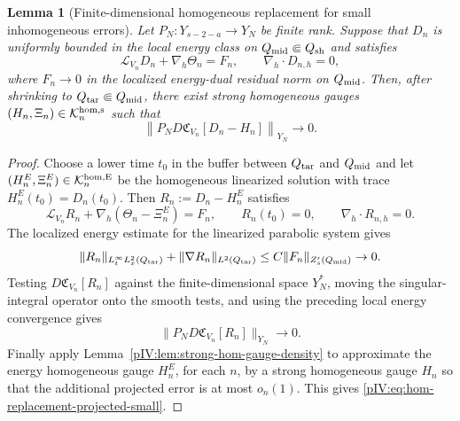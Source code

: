 \documentclass[11pt]{article}
\numberwithin{equation}{section}
\theoremstyle{plain}
\newtheorem{lemma}{Lemma}[section]
\theoremstyle{definition}
\theoremstyle{remark}
\newcommand{\nabh}{\nabla_h}
\newcommand{\divh}{\nabla_h\!\cdot}
\newcommand{\calC}{\mathfrak C}
\newcommand{\calK}{\mathcal K}
\begin{document}
\begin{lemma}[Finite-dimensional homogeneous replacement for small inhomogeneous errors]
\label{pIV:lem:homogeneous-replacement-small-errors}
Let \(P_N:Y_{s-2-a}\to Y_N\) be finite rank.  Suppose that \(D_n\) is uniformly bounded
in the local energy class on \(Q_{\rm mid}\Subset Q_{\rm sh}\) and satisfies
\begin{equation}\label{pIV:eq:small-inhomogeneous-equation}
        \mathcal L_{V_n}D_n+\nabh\Theta_n=F_n,
        \qquad
        \divh D_{n,h}=0,
\end{equation}
where \(F_n\to0\) in the localized energy-dual residual norm on \(Q_{\rm mid}\).  Then,
after shrinking to \(Q_{\rm tar}\Subset Q_{\rm mid}\), there exist strong homogeneous
gauges \((H_n,\Xi_n)\in\calK^{\rm hom,s}_n\) such that
\begin{equation}\label{pIV:eq:hom-replacement-projected-small}
        \left\|
        P_ND\calC_{V_n}[D_n-H_n]
        \right\|_{Y_N}
        \longrightarrow0 .
\end{equation}
\end{lemma}

\begin{proof}
Choose a lower time \(t_0\) in the buffer between \(Q_{\rm tar}\) and \(Q_{\rm mid}\)
and let \((H_n^E,\Xi_n^E)\in\calK^{\rm hom,E}_n\) be the homogeneous linearized
solution with trace \(H_n^E(t_0)=D_n(t_0)\).  Then
\(R_n:=D_n-H_n^E\) satisfies
\[
        \mathcal L_{V_n}R_n+\nabh(\Theta_n-\Xi_n^E)=F_n,
        \qquad
        R_n(t_0)=0,
        \qquad
        \divh R_{n,h}=0.
\]
The localized energy estimate for the linearized parabolic system gives
\[
        \|R_n\|_{L^\infty_tL^2_x(Q_{\rm tar})}
        +\|\nabla R_n\|_{L^2(Q_{\rm tar})}
        \le C\|F_n\|_{Z_s'(Q_{\rm mid})}\to0.
\]
Testing \(D\calC_{V_n}[R_n]\) against the finite-dimensional space \(Y_N^*\), moving
the singular-integral operator onto the smooth tests, and using the preceding local
energy convergence gives
\[
        \|P_ND\calC_{V_n}[R_n]\|_{Y_N}\to0.
\]
Finally apply Lemma~\ref{pIV:lem:strong-hom-gauge-density} to approximate the energy
homogeneous gauge \(H_n^E\), for each \(n\), by a strong homogeneous gauge \(H_n\) so
that the additional projected error is at most \(o_n(1)\).  This gives
\eqref{pIV:eq:hom-replacement-projected-small}.
\end{proof}
\end{document}
